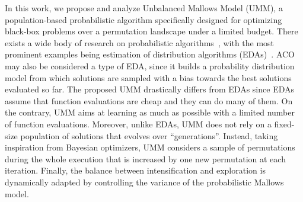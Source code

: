 \documentclass[runningheads]{llncs}
\begin{document}
In this work, we propose and analyze Unbalanced Mallows Model (UMM), a
population-based probabilistic algorithm specifically designed for optimizing
black-box problems over a permutation landscape under a limited budget. There
exists a wide body of research on probabilistic
algorithms~\citep{???},
with the most prominent examples being estimation of distribution algorithms
(EDAs)~\citep{???}. ACO may also be considered a type of EDA, since
it builds a probability distribution model from which solutions are sampled
with a bias towards the best solutions evaluated so far. The proposed UMM
drastically differs from EDAs since EDAs assume that function evaluations are
cheap and they can do many of them. On the contrary, UMM aims at learning as
much as possible with a limited number of function evaluations. Moreover,
unlike EDAs, UMM does not rely on a fixed-size population of solutions that
evolves over ``generations''. Instead, taking inspiration from Bayesian
optimizers, UMM considers a sample of permutations during the whole execution
that is increased by one new permutation at each iteration. Finally,
the balance between intensification and exploration is dynamically adapted by
controlling the variance of the probabilistic Mallows model.  




\end{document}
